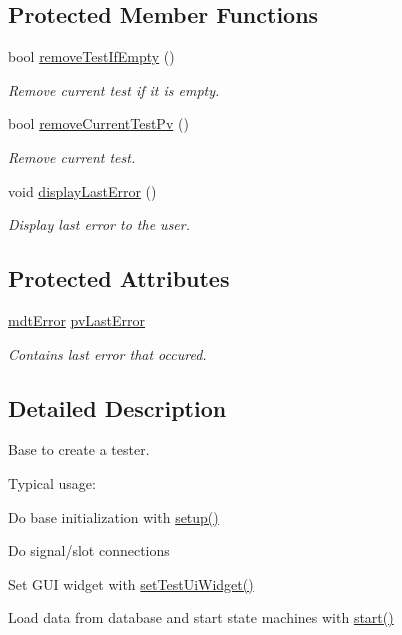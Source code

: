 \subsection*{Protected Member Functions}
\begin{DoxyCompactItemize}
\item 
bool \hyperlink{classmdt_tt_abstract_tester_a75396c57e71377ef9224d49ec3273209}{remove\-Test\-If\-Empty} ()
\begin{DoxyCompactList}\small\item\em Remove current test if it is empty. \end{DoxyCompactList}\item 
bool \hyperlink{classmdt_tt_abstract_tester_a2f19f51c28b6ec0741e7d0fc59b9f708}{remove\-Current\-Test\-Pv} ()
\begin{DoxyCompactList}\small\item\em Remove current test. \end{DoxyCompactList}\item 
void \hyperlink{classmdt_tt_abstract_tester_afc2325803369ec4d4225b9584c915c83}{display\-Last\-Error} ()
\begin{DoxyCompactList}\small\item\em Display last error to the user. \end{DoxyCompactList}\end{DoxyCompactItemize}
\subsection*{Protected Attributes}
\begin{DoxyCompactItemize}
\item 
\hyperlink{classmdt_error}{mdt\-Error} \hyperlink{classmdt_tt_abstract_tester_a99947ad3028815b144027beb8a8496ef}{pv\-Last\-Error}
\begin{DoxyCompactList}\small\item\em Contains last error that occured. \end{DoxyCompactList}\end{DoxyCompactItemize}


\subsection{Detailed Description}
Base to create a tester. 

Typical usage\-:
\begin{DoxyItemize}
\item Do base initialization with \hyperlink{classmdt_tt_abstract_tester_a08e423ef173c8f925b351110637c8050}{setup()}
\item Do signal/slot connections
\item Set G\-U\-I widget with \hyperlink{classmdt_tt_abstract_tester_a9cc3f5bfe9e27ac0ae376ea1c82e8585}{set\-Test\-Ui\-Widget()}
\item Load data from database and start state machines with \hyperlink{classmdt_tt_abstract_tester_ab1095b5fc987c9d52de66b6c02ec7785}{start()} 
\end{DoxyItemize}

